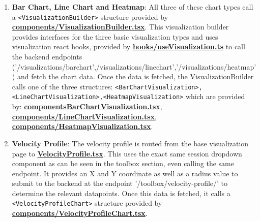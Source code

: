 \documentclass{article}
\begin{document}
\begin{enumerate}

  \item{\textbf{Bar Chart, Line Chart and Heatmap}: All three of these chart types call a \texttt{<VisualizationBuilder>} structure provided by \newline \href{https://github.com/OCD-Rats-Capstone/OCD-Rat-Infrastructure/blob/main/src/ocd-rat-frontend/src/components/VisualizationBuilder.tsx}{\textbf{components/VisualizationBuilder.tsx}}.
  This visualization builder provides interfaces for the three basic visualization types and uses visualization react hooks, provided by \href{https://github.com/OCD-Rats-Capstone/OCD-Rat-Infrastructure/blob/main/src/ocd-rat-frontend/src/hooks/useVisualization.ts}{\textbf{hooks/useVisualization.ts}} to call the backend 
  endpoints ('/visualizations/barchart',/visualizations/linechart',\newline'/visualizations/heatmap') and fetch the chart data. Once the data is fetched, the VisualizationBuilder calls one of the three structures: \texttt{<BarChartVisualization>,\newline <LineChartVisualization>,<HeatmapVisualization>} which
  are provided by: \href{https://github.com/OCD-Rats-Capstone/OCD-Rat-Infrastructure/blob/main/src/ocd-rat-frontend/src/components/BarChartVisualization.tsx}{\textbf{components\/BarChartVisualization.tsx}}, \href{https://github.com/OCD-Rats-Capstone/OCD-Rat-Infrastructure/blob/main/src/ocd-rat-frontend/src/components/LineChartVisualization.tsx}{\textbf{components/LineChartVisualization.tsx}}, \href{https://github.com/OCD-Rats-Capstone/OCD-Rat-Infrastructure/blob/main/src/ocd-rat-frontend/src/components/HeatmapVisualization.tsx}{\textbf{components/HeatmapVisualization.tsx}}.}
  \item{\textbf{Velocity Profile}: The velocity profile is routed from the base visualization page to \href{https://github.com/OCD-Rats-Capstone/OCD-Rat-Infrastructure/blob/main/src/ocd-rat-frontend/src/pages/VelocityProfile.tsx}{\textbf{VelocityProfile.tsx}}. This
  uses the exact same session dropdown component as can be seen in the toolbox section, even calling the same endpoint. It provides an X and Y coordinate as well as a radius value
  to submit to the backend at the endpoint '/toolbox/velocity-profile/' to determine the relevant datapoints. Once this data is fetched, it calls a \texttt{<VelocityProfileChart>} structure provided by \href{https://github.com/OCD-Rats-Capstone/OCD-Rat-Infrastructure/blob/main/src/ocd-rat-frontend/src/components/VelocityProfileChart.tsx}{\textbf{components/VelocityProfileChart.tsx}}.
}
\end{enumerate}
\end{document}
